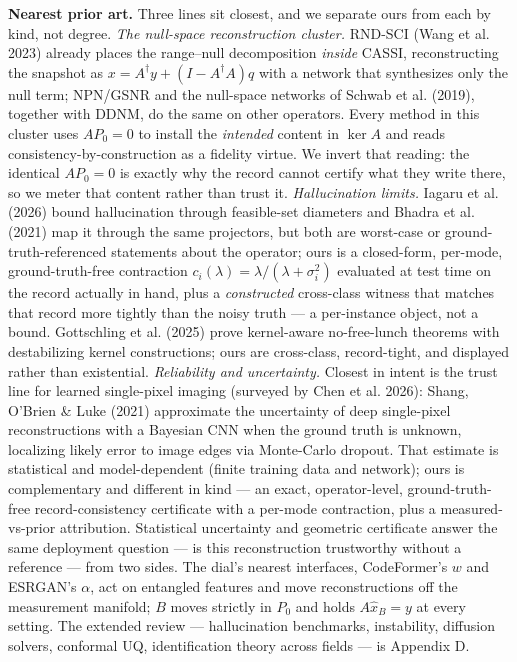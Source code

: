 \documentclass[11pt]{article}
\begin{document}
\textbf{Nearest prior art.} Three lines sit closest, and we separate ours from each by kind, not degree. \textit{The null-space reconstruction cluster.} RND-SCI (Wang et al. 2023) already places the range--null decomposition \textit{inside} CASSI, reconstructing the snapshot as $x = A^\dagger y + (I - A^\dagger A)q$ with a network that synthesizes only the null term; NPN/GSNR and the null-space networks of Schwab et al. (2019), together with DDNM, do the same on other operators. Every method in this cluster uses $A P_0 = 0$ to install the \textit{intended} content in $\ker A$ and reads consistency-by-construction as a fidelity virtue. We invert that reading: the identical $A P_0 = 0$ is exactly why the record cannot certify what they write there, so we meter that content rather than trust it. \textit{Hallucination limits.} Iagaru et al. (2026) bound hallucination through feasible-set diameters and Bhadra et al. (2021) map it through the same projectors, but both are worst-case or ground-truth-referenced statements about the operator; ours is a closed-form, per-mode, ground-truth-free contraction $c_i(\lambda)=\lambda/(\lambda+\sigma_i^2)$ evaluated at test time on the record actually in hand, plus a \textit{constructed} cross-class witness that matches that record more tightly than the noisy truth --- a per-instance object, not a bound. Gottschling et al. (2025) prove kernel-aware no-free-lunch theorems with destabilizing kernel constructions; ours are cross-class, record-tight, and displayed rather than existential. \textit{Reliability and uncertainty.} Closest in intent is the trust line for learned single-pixel imaging (surveyed by Chen et al. 2026): Shang, O'Brien \& Luke (2021) approximate the uncertainty of deep single-pixel reconstructions with a Bayesian CNN when the ground truth is unknown, localizing likely error to image edges via Monte-Carlo dropout. That estimate is statistical and model-dependent (finite training data and network); ours is complementary and different in kind --- an exact, operator-level, ground-truth-free record-consistency certificate with a per-mode contraction, plus a measured-vs-prior attribution. Statistical uncertainty and geometric certificate answer the same deployment question --- is this reconstruction trustworthy without a reference --- from two sides. The dial's nearest interfaces, CodeFormer's $w$ and ESRGAN's $\alpha$, act on entangled features and move reconstructions off the measurement manifold; $B$ moves strictly in $P_0$ and holds $A\hat{x}_B = y$ at every setting. The extended review --- hallucination benchmarks, instability, diffusion solvers, conformal UQ, identification theory across fields --- is Appendix D.
\end{document}
